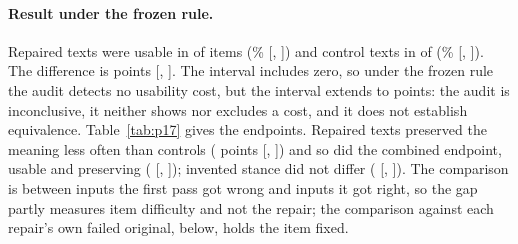 \paragraph{Result under the frozen rule.}
Repaired texts were usable in \jmpOneSevenRepUsableK{} of \jmpOneSevenRepUsableN{} items (\jmpOneSevenRepUsable{}\% [\jmpOneSevenRepUsableLo{}, \jmpOneSevenRepUsableHi{}]) and control texts in \jmpOneSevenCtlUsableK{} of \jmpOneSevenCtlUsableN{} (\jmpOneSevenCtlUsable{}\% [\jmpOneSevenCtlUsableLo{}, \jmpOneSevenCtlUsableHi{}]). The difference is \jmpOneSevenDiffUsable{} points [\jmpOneSevenDiffUsableLo{}, \jmpOneSevenDiffUsableHi{}]. The interval includes zero, so under the frozen rule the audit detects no usability cost, but the interval extends to \jmpOneSevenDiffUsableLo{} points: the audit is inconclusive, it neither shows nor excludes a cost, and it does not establish equivalence. Table~\ref{tab:p17} gives the endpoints. Repaired texts preserved the meaning less often than controls (\jmpOneSevenDiffPres{} points [\jmpOneSevenDiffPresLo{}, \jmpOneSevenDiffPresHi{}]) and so did the combined endpoint, usable and preserving (\jmpOneSevenDiffUsPres{} [\jmpOneSevenDiffUsPresLo{}, \jmpOneSevenDiffUsPresHi{}]); invented stance did not differ (\jmpOneSevenDiffStance{} [\jmpOneSevenDiffStanceLo{}, \jmpOneSevenDiffStanceHi{}]). The comparison is between inputs the first pass got wrong and inputs it got right, so the gap partly measures item difficulty and not the repair; the comparison against each repair's own failed original, below, holds the item fixed.

